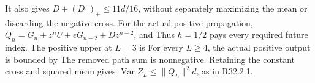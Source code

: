 It also gives \(D+(D_1)_+\le11d/16\), without separately maximizing the
mean or discarding the negative cross. For the actual positive propagation,
\(Q_n=G_n+z^nU+\epsilon G_{n-2}+Dz^{n-2}\), and
Thus \(h=1/2\) pays every required future index. The positive upper at
\(L=3\) is
For every \(L\ge4\), the actual positive output is bounded by
The removed path sum is nonnegative.
Retaining the constant cross and squared mean gives
\(\operatorname{Var}Z_L\le\lVert Q_L\rVert^2d\), as in R32.2.1.

